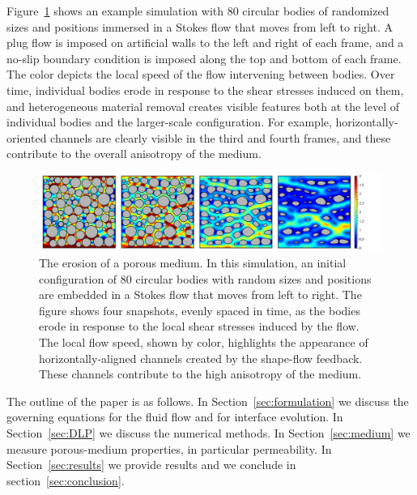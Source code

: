 \documentclass[3p]{elsarticle}
\begin{document}
	Figure~\ref{fig1} shows an example simulation with 80 circular bodies of randomized sizes and positions immersed in a Stokes flow that moves from left to right. A plug flow is imposed on artificial walls to the left and right of each frame, and a no-slip boundary condition is imposed along the top and bottom of each frame. The color depicts the local speed of the flow intervening between bodies. Over time, individual bodies erode in response to the shear stresses induced on them, and heterogeneous material removal creates visible features both at the level of individual bodies and the larger-scale configuration. For example, horizontally-oriented channels are clearly visible in the third and fourth frames, and these contribute to the overall anisotropy of the medium.



\begin{figure}%
\centering
\includegraphics[width = 0.99 \textwidth]{./figs/Velocity-80-4.pdf}
\caption{The erosion of a porous medium. In this simulation, an initial configuration of 80 circular bodies with random sizes and positions are embedded in a Stokes flow that moves from left to right. The figure shows four snapshots, evenly spaced in time, as the bodies erode in response to the local shear stresses induced by the flow. The local flow speed, shown by color, highlights the appearance of horizontally-aligned channels created by the shape-flow feedback. These channels contribute to the high anisotropy of the medium.
\label{fig1}
}
\end{figure}

The outline of the paper is as follows. In Section~\ref{sec:formulation} we discuss the governing equations for the fluid flow and for interface evolution. In Section~\ref{sec:DLP} we discuss the numerical methods. In Section~\ref{sec:medium} we measure porous-medium properties, in particular permeability. In Section~\ref{sec:results} we provide results and we conclude in section~\ref{sec:conclusion}.
\end{document}
